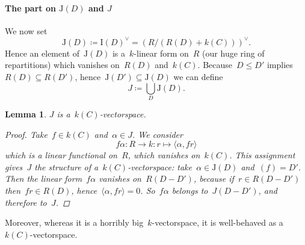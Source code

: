 \documentclass[10pt,a4paper]{article}
\theoremstyle{lecture}
\newtheorem{lemma}[theorem]{Lemma}
\newcommand\dash{\nobreakdash-\hspace{0pt}}
\begin{document}
\paragraph{The part on $\mathrm{J}(D)$ and $J$}
We now set
\begin{equation}
  \mathrm{J}(D)\coloneqq\mathrm{I}(D)^\vee=(R/(R(D)+k(C)))^\vee.
\end{equation}
Hence an element of~$\mathrm{J}(D)$ is a~$k$\dash linear form on~$R$ (our huge ring of repartitions) which vanishes on~$R(D)$ and~$k(C)$. Because~$D\leq D'$ implies~$R(D)\subseteq R(D')$, hence~$\mathrm{J}(D')\subseteq\mathrm{J}(D)$ we can define
\begin{equation}
  J\coloneqq\bigcup_{D}\mathrm{J}(D).
\end{equation}
\begin{lemma}
  \label{lemma:J-k(C)-vectorspace}
  $J$ is a~$k(C)$\dash vectorspace.
  \begin{proof}
    Take~$f\in k(C)$ and~$\alpha\in J$. We consider
    \begin{equation}
      f\alpha\colon R\to k:r\mapsto\langle\alpha,fr\rangle
    \end{equation}
    which is a linear functional on~$R$, which vanishes on~$k(C)$. This assignment gives~$J$ the structure of a~$k(C)$\dash vectorspace: take~$\alpha\in\mathrm{J}(D)$ and~$(f)=D'$. Then the linear form~$f\alpha$ vanishes on~$R(D-D')$, because if~$r\in R(D-D')$ then~$fr\in R(D)$, hence~$\langle\alpha,fr\rangle=0$. So~$f\alpha$ belongs to~$J(D-D')$, and therefore to~$J$.
  \end{proof}
\end{lemma}
Moreover, whereas it is a horribly big~$k$\dash vectorspace, it is well-behaved as a~$k(C)$\dash vectorspace.
\end{document}
